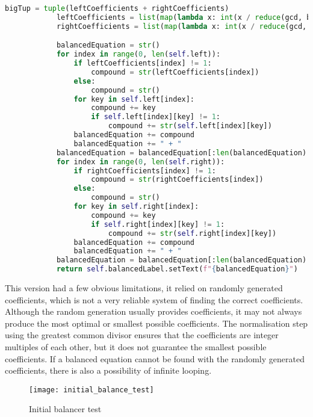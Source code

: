 \documentclass[a4paper,12pt]{article}
\begin{document}
\begin{lstlisting}[language=Python, caption=balance method, label={lst:balance_method}]
            bigTup = tuple(leftCoefficients + rightCoefficients)
            leftCoefficients = list(map(lambda x: int(x / reduce(gcd, bigTup)), leftCoefficients))
            rightCoefficients = list(map(lambda x: int(x / reduce(gcd, bigTup)), rightCoefficients))

            balancedEquation = str()
            for index in range(0, len(self.left)):
                if leftCoefficients[index] != 1:
                    compound = str(leftCoefficients[index])
                else:
                    compound = str()
                for key in self.left[index]:
                    compound += key
                    if self.left[index][key] != 1:
                        compound += str(self.left[index][key])
                balancedEquation += compound
                balancedEquation += " + "
            balancedEquation = balancedEquation[:len(balancedEquation) - 3] + " = "
            for index in range(0, len(self.right)):
                if rightCoefficients[index] != 1:
                    compound = str(rightCoefficients[index])
                else:
                    compound = str()
                for key in self.right[index]:
                    compound += key
                    if self.right[index][key] != 1:
                        compound += str(self.right[index][key])
                balancedEquation += compound
                balancedEquation += " + "
            balancedEquation = balancedEquation[:len(balancedEquation) - 2]
            return self.balancedLabel.setText(f"{balancedEquation}")
\end{lstlisting}

\newpage

This version had a few obvious limitations, it relied on randomly generated coefficients, which is not a very reliable system of finding the correct coefficients. Although the random generation usually provides coefficients, it  may not always produce the most optimal or smallest possible coefficients. The normalisation step using the greatest common divisor ensures that the coefficients are integer multiples of each other, but it does not guarantee the smallest 	possible coefficients. If a balanced equation cannot be found with the randomly generated coefficients, there is also a possibility of infinite looping.

\begin{figure} [h]
	\centering
	\texttt{[image: initial\_balance\_test]}
	\caption{Initial balancer test}
	\label{fig:initial_balance_test}
\end{figure}
\end{document}
